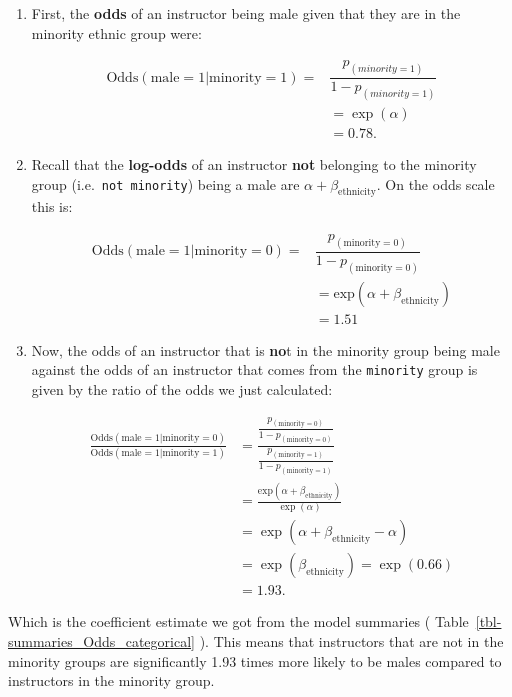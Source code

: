 \documentclass[
  letterpaper,
  DIV=11,
  numbers=noendperiod]{scrartcl}
\begin{document}
\begin{enumerate}
\def\labelenumi{\arabic{enumi}.}
\item
  First, the \textbf{odds} of an instructor being male given that they
  are in the minority ethnic group were:

  \begin{align}
  \mathrm{Odds}(\mathrm{male} = 1 | \mathrm{minority} = 1) =& 
  \dfrac{p_{(minority=1)}}{1 - p_{(minority=1)}} \\
  &= \exp\left(\alpha\right) \\ &= 0.78. \nonumber
  \end{align}
\item
  Recall that the \textbf{log-odds} of an instructor \textbf{not}
  belonging to the minority group (i.e.~\texttt{not\ minority}) being a
  male are \(\alpha +\beta_{\text{ethnicity}}\). On the odds scale this
  is:

  \begin{align}
  \mathrm{Odds}(\mathrm{male} = 1 | \mathrm{minority} = 0) =& \dfrac{p_{(\mathrm{minority} = 0)}}{1- p_{(\mathrm{minority} = 0)}}\\
  &= \mathrm{exp}( \alpha + \beta_{\text{ethnicity}}) \\
  &= 1.51
  \end{align}
\item
  Now, the odds of an instructor that is \textbf{no}t in the minority
  group being male against the odds of an instructor that comes from the
  \texttt{minority} group is given by the ratio of the odds we just
  calculated:

  \begin{align}
  \frac{\mathrm{Odds}(\mathrm{male} = 1| \mathrm{minority} = 0)}{\mathrm{Odds}(\mathrm{male} = 1| \mathrm{minority} = 1)} &= \dfrac{\frac{p_{(\mathrm{minority} = 0)}}{1- p_{(\mathrm{minority} = 0)}}}{\frac{p_{(\mathrm{minority}=1)}}{1- p_{(\mathrm{minority}=1)}}} \\
  &= \frac{\mathrm{exp}( \alpha + \beta_{\text{ethnicity}})}{\exp\left(\alpha\right)}\\ 
  &= \exp\left(\alpha + \beta_{\text{ethnicity}} - \alpha\right) \\
  &= \exp\left(\beta_{\text{ethnicity}}\right) = \exp\left(0.66 \right) \\
  &= 1.93. \nonumber 
  \end{align}
\end{enumerate}

Which is the coefficient estimate we got from the model summaries (
Table~\ref{tbl-summaries_Odds_categorical} ). This means that
instructors that are not in the minority groups are significantly 1.93
times more likely to be males compared to instructors in the minority
group.
\end{document}
